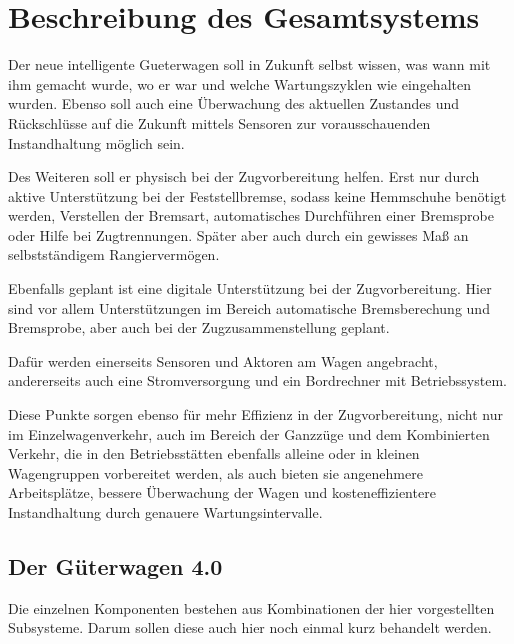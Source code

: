\section{Beschreibung des Gesamtsystems}
Der neue intelligente \gls{Gueterwagen} soll in Zukunft selbst wissen, was wann mit ihm gemacht wurde, wo er war und welche Wartungszyklen wie eingehalten wurden. Ebenso soll auch eine Überwachung des aktuellen Zustandes und Rückschlüsse auf die Zukunft mittels Sensoren zur vorausschauenden Instandhaltung möglich sein.\par
Des Weiteren  soll er physisch bei der Zugvorbereitung helfen. Erst nur durch aktive Unterstützung bei der Feststellbremse, sodass keine \gls{Hemmschuh}e benötigt werden, Verstellen der \gls{Bremsart}, automatisches Durchführen einer \gls{Bremsprobe} oder Hilfe bei Zugtrennungen. Später aber auch durch ein gewisses Maß an selbstständigem Rangiervermögen.\par
Ebenfalls geplant ist eine digitale Unterstützung bei der Zugvorbereitung. Hier sind vor allem Unterstützungen im Bereich automatische Bremsberechung und \gls{Bremsprobe}, aber auch bei der Zugzusammenstellung geplant.\par
Dafür werden einerseits Sensoren und Aktoren am Wagen angebracht, andererseits auch eine Stromversorgung und ein Bordrechner mit Betriebssystem.\par
Diese Punkte sorgen ebenso für mehr Effizienz in der Zugvorbereitung, nicht nur im Einzelwagenverkehr, auch im Bereich der Ganzzüge und dem Kombinierten Verkehr, die in den Betriebsstätten ebenfalls alleine oder in kleinen Wagengruppen vorbereitet werden, als auch bieten sie angenehmere Arbeitsplätze, bessere Überwachung der Wagen und kosteneffizientere Instandhaltung durch genauere Wartungsintervalle.\par

\subsection{Der Güterwagen 4.0}
Die einzelnen Komponenten bestehen aus Kombinationen der hier vorgestellten Subsysteme. Darum sollen diese auch hier noch einmal kurz behandelt werden.

